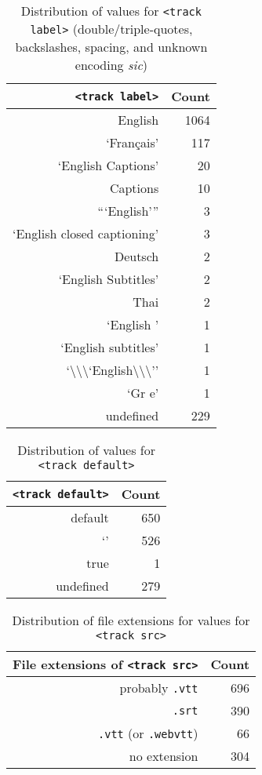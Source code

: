 \documentclass{sig-alternate}
\makeatletter
\newcommand\unknown{%
  \sbox\Diam@nd{\raisebox{-1ex}{\scalebox{1}[1.2]{\rotatebox{45}{\rule{0.8em}{0.8em}}}}}%
  \makebox[\wd\Diam@nd]{\makebox[0pt]{\usebox\Diam@nd}\makebox[0pt]{\textcolor{white}{?}}}}
\makeatother
\begin{document}
\begin{table}[p]
  \centering
  \begin{tabular}{ r | r }                       
    \texttt{<track label>} & Count \\
    \hline  
    English & 1064\\
    `Français' & 117\\    
    `English Captions' & 20\\    
    Captions & 10\\
    ```English''' & 3\\    
    `English closed captioning' & 3\\    
    Deutsch & 2\\    
    `English Subtitles' & 2\\
    Thai & 2\\    
    `English ' & 1\\
    `English subtitles' & 1\\
    `\textbackslash\textbackslash\textbackslash`English\textbackslash\textbackslash\textbackslash'' & 1\\
    `Gr\unknown\unknown e' & 1\\
    undefined & 229\\
  \end{tabular}
  \caption{Distribution of values for
    \texttt{<track label>} \tiny (double/triple-quotes,
    backslashes, spacing, and unknown encoding
    \emph{sic})}
  \label{table:label}    
\end{table}
  
\begin{table}[p]
  \centering
  \begin{tabular}{ r | r }                       
    \texttt{<track default>} & Count \\
    \hline
    default & 650\\
    `' & 526\\
    true & 1\\
    undefined & 279
  \end{tabular}
  \caption{Distribution of values for
    \texttt{<track default>}}
  \label{table:default}    
\end{table}

\begin{table}[p]
  \centering
  \begin{tabular}{ r | r }                       
    File extensions of \texttt{<track src>} & Count \\
    \hline
    probably \texttt{.vtt} & 696\\
    \texttt{.srt} & 390\\
    \texttt{.vtt} (or \texttt{.webvtt}) & 66\\
    no extension & 304\\
  \end{tabular}
  \caption{Distribution of file extensions for
    values for \texttt{<track src>}}
  \label{table:src}    
\end{table}
\end{document}
